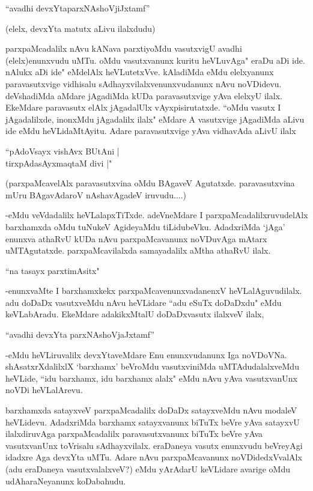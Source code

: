 \begin{shloka}
``avadhi devxYtaparxNAshoVjiJxtamf''
\end{shloka}

(elelx, devxYta matutx aLivu ilalxdudu)

parxpaMcadalilx nAvu kANava parxtiyoMdu vasutxvigU avadhi (elelx)enunxvudu uMTu. oMdu vasutxvanunx kuritu heVLuvAga" eraDu aDi ide. nAlukx aDi ide" eMdelAlx heVLutetxVve. kAladiMda eMdu elelxyanunx paravasutxvige vidhisalu sAdhayxvilalxvenunxvudanunx nAvu noVDidevu. deVshadiMda aMdare jAgadiMda kUDa paravasutxvige yAva elelxyU ilalx. EkeMdare paravasutx elAlx jAgadalUlx vAyxpisirutatxde. ``oMdu vasutx I jAgadalilxde, inonxMdu jAgadalilx ilalx" eMdare A vasutxvige jAgadiMda aLivu ide eMdu heVLidaMtAyitu. Adare paravasutxvige yAva vidhavAda aLivU ilalx 

\begin{shloka}
``pAdoV\s sayx vishAvx BUtAni |\\
tirxpAdasAyxmaqtaM divi |"
\end{shloka}
 
 (parxpaMcavelAlx paravasutxvina oMdu BAgaveV Agutatxde. paravasutxvina mUru BAgavAdaroV nAshavAgadeV iruvudu....)
 
 
 -eMdu veVdadalilx heVLalapxTiTxde. adeVneMdare I parxpaMcadalilxruvudelAlx barxhamxda oMdu tuNukeV AgideyaMdu tiLidubeVku. AdadxriMda `jAga' enunxva athaRvU kUDa nAvu parxpaMcavanunx noVDuvAga mAtarx uMTAgutatxde. parxpaMcavilalxda samayadalilx aMtha athaRvU ilalx.
 
 
 \begin{shloka}
 ``na tasayx parxtimA\s sitx"
\end{shloka} 

-enunxvaMte I barxhamxkekx parxpaMcavenunxvadanenxV heVLalAguvudilalx. adu doDaDx vasutxveMdu nAvu heVLidare ``adu eSuTx doDaDxdu" eMdu keVLabAradu. EkeMdare adakikxMtalU doDaDxvasutx ilalxveV ilalx, 

\begin{shloka}
``avadhi devxYta parxNAshoVjaJxtamf''
\end{shloka}

-eMdu heVLiruvalilx devxYtaveMdare Enu enunxvudanunx Iga noVDoVNa. shAsatxrXdalilxlX `barxhamx' beVroMdu vasutxviniMda uMTAdudalalxveMdu heVLide, ``idu barxhamx, idu barxhamx alalx" eMdu nAvu yAva vasutxvanUnx noVDi heVLalArevu. 


barxhamxda satayxveV parxpaMcadalilx doDaDx satayxveMdu nAvu modaleV heVLidevu. AdadxriMda barxhamx satayxvanunx biTuTx beVre yAva satayxvU ilalxdiruvAga parxpaMcadalilx paravasutxvanunx biTuTx beVre yAva vasutxvanUnx toVrisalu sAdhayxvilalx. eraDaneya vasutx enunxvudu beVreyAgi idadxre Aga devxYta uMTu. Adare nAvu parxpaMcavanunx noVDidedxVvalAlx (adu eraDaneya vasutxvalalxveV?) eMdu yArAdarU keVLidare avarige oMdu udAharaNeyanunx koDabahudu. 

